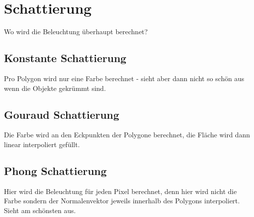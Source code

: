 \section{Schattierung}
Wo wird die Beleuchtung überhaupt berechnet?
\subsection{Konstante Schattierung}
Pro Polygon wird nur eine Farbe berechnet - sieht aber dann nicht so schön aus wenn die Objekte gekrümmt sind.
\subsection{Gouraud Schattierung}
Die Farbe wird an den Eckpunkten der Polygone berechnet, die Fläche wird dann linear interpoliert gefüllt.
\subsection{Phong Schattierung}
Hier wird die Beleuchtung für jeden Pixel berechnet, denn hier wird nicht die Farbe sondern der Normalenvektor jeweils innerhalb des Polygons interpoliert. Sieht am schönsten aus.